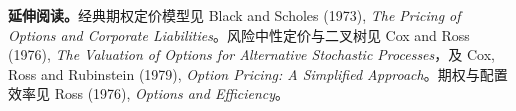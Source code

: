 \textbf{延伸阅读。}经典期权定价模型见 Black and Scholes (1973), \emph{The Pricing of Options and Corporate Liabilities}。风险中性定价与二叉树见 Cox and Ross (1976), \emph{The Valuation of Options for Alternative Stochastic Processes}，及 Cox, Ross and Rubinstein (1979), \emph{Option Pricing: A Simplified Approach}。期权与配置效率见 Ross (1976), \emph{Options and Efficiency}。
\fi

\WJChapterExercises

\endgroup
